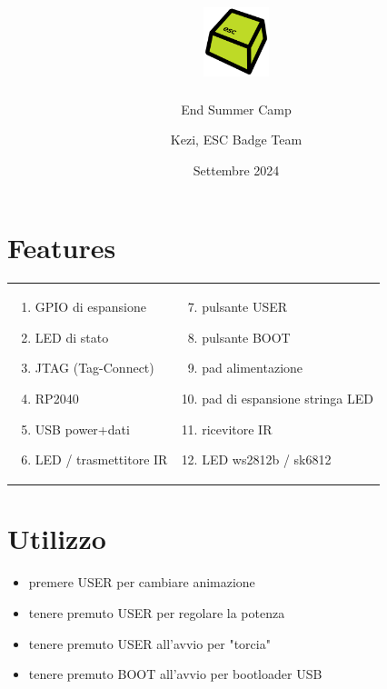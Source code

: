 \documentclass[10pt]{datasheet}
\title{\includegraphics[height=2cm]{logo} \raisebox{1\height}{Hardware mini-badge "P2N"}}
\author{End Summer Camp}
\date{Settembre 2024}
\author{Kezi, ESC Badge Team}
\begin{document}
	\maketitle
	
	\section{Features}
	\begin{tabular}{l l}
		  \begin{minipage}{1.5in}

				\begin{enumerate}[itemsep=1pt]
				\item{GPIO di espansione}
				\item{LED di stato}
				\item{JTAG (Tag-Connect)}
				\item{RP2040}
				\item{USB power+dati}
				\item{LED / trasmettitore IR}

			\end{enumerate} 
			
			\end{minipage}&
				  \begin{minipage}{2in}

			\begin{enumerate}[itemsep=1pt]
			\setcounter{enumi}{6}
			\item{pulsante USER}
			\item{pulsante BOOT}
			\item{pad alimentazione}
			\item{pad di espansione stringa LED}
			\item{ricevitore IR}
			\item LED ws2812b / sk6812
			\end{enumerate} 
			
		\end{minipage}
	\end{tabular}

	
	\section{Utilizzo}
	
	\begin{itemize}[itemsep=1pt] 
		\item{premere USER per cambiare animazione}
		\item{tenere premuto USER per regolare la potenza}
		\item{tenere premuto USER all'avvio per "torcia"}
		\item{tenere premuto BOOT all'avvio per bootloader USB}
	\end{itemize}
	
\end{document}
